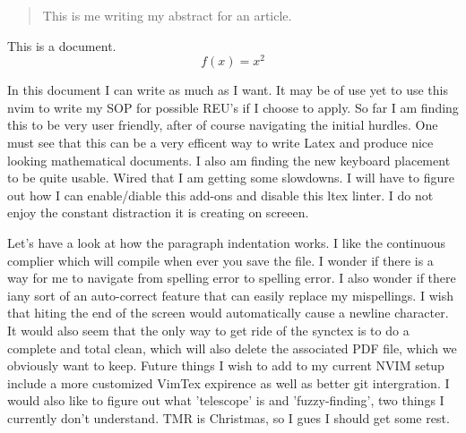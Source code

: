 \documentclass{article}
\begin{document}
\begin{abstract} 
	This is me writing my abstract for an article. 
\end{abstract}
This is a document.
\begin{equation}
	f(x) = x^2
\end{equation}

In this document I can write as much as I want. It may be of use yet to use this nvim to write my SOP for possible REU's if I choose to apply. So far I am finding this to be very user friendly, after of course navigating the initial 
hurdles. One must see that this can be a very efficent way to write Latex and produce nice looking mathematical documents. I also am finding the new keyboard placement to be quite usable. Wired that I am getting some slowdowns. 
I will have to figure out how I can enable/diable this add-ons and disable this ltex linter. I do not enjoy the constant distraction it is creating on screeen. 

Let's have a look at how the paragraph indentation works. I like the continuous complier which will compile when ever you save the file. I wonder if there is a way for me to navigate from spelling error to spelling error. I also wonder if there iany sort of an auto-correct feature that can easily replace my mispellings. I wish that hiting the end of the screen would automatically cause a newline character. It would also seem that the only way to get ride of the synctex is to do a 
complete and total clean, which will also delete the associated PDF file, which we obviously want to keep. Future things I wish to add to my current NVIM setup include a more customized VimTex expirence as well as better git intergration. I would also like to figure out what 'telescope' is and 'fuzzy-finding', two things I currently don't understand. TMR is Christmas, so I gues I should get some rest. 
\end{document}
